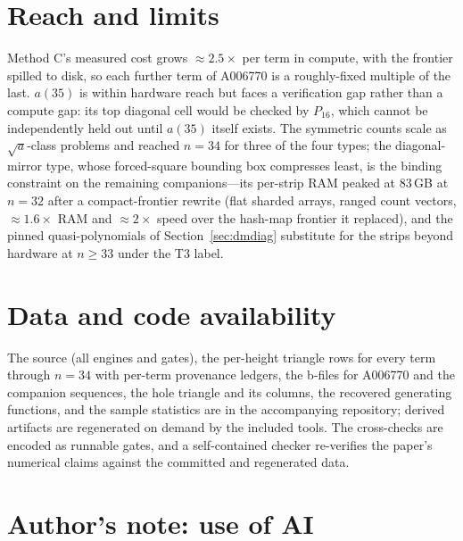 \documentclass[11pt]{article}
\newcommand{\tierthree}{\textsf{T3}}
\begin{document}
\section{Reach and limits}
\label{sec:reach}

Method C's measured cost grows $\approx2.5\times$ per term in compute, with
the frontier spilled to disk, so each further term of A006770 is a
roughly-fixed multiple of the last. $a(35)$ is within hardware reach but
faces a verification gap rather than a compute gap: its top diagonal cell
would be checked by $P_{16}$, which cannot be independently held out until
$a(35)$ itself exists. The symmetric counts scale as
$\sqrt{a}$-class problems and reached $n=34$ for three of the four types;
the diagonal-mirror type, whose forced-square bounding box compresses least,
is the binding constraint on the remaining companions---its per-strip RAM
peaked at $83$\,GB at $n=32$ after a compact-frontier rewrite (flat sharded
arrays, ranged count vectors, $\approx1.6\times$ RAM and $\approx2\times$
speed over the hash-map frontier it replaced), and the pinned
quasi-polynomials of Section~\ref{sec:dmdiag} substitute for the strips
beyond hardware at $n\ge33$ under the \tierthree{} label.

\section{Data and code availability}
\label{sec:availability}

The source (all engines and gates), the per-height triangle rows for every
term through $n=34$ with per-term provenance ledgers, the b-files for
A006770 and the companion sequences, the hole triangle and its columns, the
recovered generating functions, and the sample statistics are in the
accompanying repository; derived artifacts are regenerated on demand by the
included tools. The cross-checks are encoded as runnable gates, and a
self-contained checker re-verifies the paper's numerical claims against the
committed and regenerated data.

\section{Author's note: use of AI}
\label{sec:ai}
\end{document}
